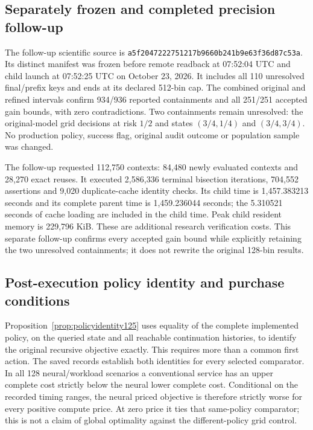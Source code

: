 \subsection{Separately frozen and completed precision follow-up}

The follow-up scientific source is
\nolinkurl{a5f2047222751217b9660b241b9e63f36d87c53a}. Its distinct
manifest was frozen before remote readback at 07:52:04 UTC and child launch
at 07:52:25 UTC on October 23, 2026. It includes all 110 unresolved
final/prefix keys and ends at its declared 512-bin cap. The combined
original and refined intervals confirm 934/936 reported containments and
all 251/251 accepted gain bounds, with zero contradictions. Two containments
remain unresolved: the original-model grid decisions at risk $1/2$ and
states $(3/4,1/4)$ and $(3/4,3/4)$. No production policy, success flag,
original audit outcome or population sample was changed.

The follow-up requested 112,750 contexts: 84,480 newly evaluated contexts
and 28,270 exact reuses. It executed 2,586,336 terminal bisection iterations,
704,552 assertions and 9,020 duplicate-cache identity checks. Its child
time is 1,457.383213 seconds and its complete parent time is 1,459.236044
seconds; the 5.310521 seconds of cache loading are included in the child
time. Peak child resident memory is 229,796 KiB. These are additional
research verification costs. This separate follow-up confirms every
accepted gain bound while explicitly retaining the two unresolved
containments; it does not rewrite the original 128-bin results.

\subsection{Post-execution policy identity and purchase conditions}

Proposition~\ref{prop:policyidentity125} uses equality of the complete
implemented policy, on the queried state and all reachable continuation
histories, to identify the original recursive objective exactly. This
requires more than a common first action. The saved records establish both
identities for every selected comparator. In all 128 neural/workload
scenarios a conventional service has an upper complete cost strictly below
the neural lower complete cost. Conditional on the recorded timing ranges,
the neural priced objective is therefore strictly worse for every positive
compute price. At zero price it ties that same-policy comparator; this is
not a claim of global optimality against the different-policy grid control.

